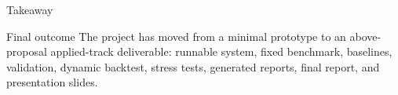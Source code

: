 \documentclass[aspectratio=169]{beamer}
\begin{document}
\begin{frame}{Takeaway}
  \begin{block}{Final outcome}
    The project has moved from a minimal prototype to an above-proposal applied-track deliverable: runnable system, fixed benchmark, baselines, validation, dynamic backtest, stress tests, generated reports, final report, and presentation slides.
  \end{block}
\end{frame}
\end{document}
